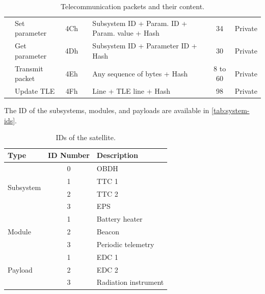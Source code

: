 \begin{landscape}
\begin{table}[ht]
\begin{tabular}{L{1.8cm}lcllcc}
                                     & Set parameter       & 4Ch &                                     & Subsystem ID + Param. ID + Param. value + Hash    & 34        & Private \\
                                     & Get parameter       & 4Dh &                                     & Subsystem ID + Parameter ID + Hash                & 30        & Private \\
                                     & Transmit packet     & 4Eh &                                     & Any sequence of bytes + Hash                      & 8 to 60   & Private \\
                                     & Update TLE          & 4Fh &                                     & Line + TLE line + Hash                            & 98        & Private \\
            \bottomrule[1.5pt]
        \end{tabular}
        \caption{Telecommunication packets and their content.}
        \label{tab:packets-struct}
    \end{table}
\end{landscape}

The ID of the subsystems, modules, and payloads are available in \autoref{tab:system-ids}.

\begin{table}[ht]
    \centering
    \begin{tabular}{lcl}
        \toprule[1.5pt]
        \textbf{Type} & \textbf{ID Number} & \textbf{Description} \\
        \midrule
        \multirow{4}{*}{Subsystem} & 0 & OBDH \\
                                   & 1 & TTC 1 \\
                                   & 2 & TTC 2 \\
                                   & 3 & EPS \\
        \midrule
        \multirow{3}{*}{Module}    & 1 & Battery heater \\
                                   & 2 & Beacon \\
                                   & 3 & Periodic telemetry \\
        \midrule
        \multirow{4}{*}{Payload}   & 1 & EDC 1 \\
                                   & 2 & EDC 2 \\
                                   & 3 & Radiation instrument \\
        \bottomrule[1.5pt]
    \end{tabular}
    \caption{IDs of the satellite.}
    \label{tab:system-ids}
\end{table}

